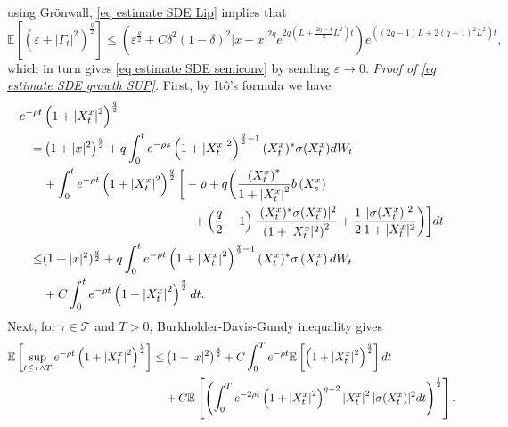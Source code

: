 \documentclass[11pt]{amsart}
\theoremstyle{plain}
\def \dd{{\rm d}}
\numberwithin{equation}{section}
\begin{document}
using Grönwall,  \eqref{eq estimate SDE Lip} implies that
$$
\mathbb{E}\left[\left(\varepsilon+\left|\Gamma_{t}\right|^{2}\right)^{\frac{q}{2}}\right] \leq\left(\varepsilon^{\frac q 2}+C \delta^2(1-\delta)^2 |\bar{x}-x|^{2 q} e^{2 q\left(L+\frac{2 q-1}{2} L^{2}\right) t}\right) e^{\left((2 q-1) L+2(q-1)^{2} L^{2}\right) t},
$$
which in turn gives \eqref{eq estimate SDE semiconv} by sending $\varepsilon \rightarrow 0$. 
\smallbreak\noindent
\emph{Proof of \eqref{eq estimate SDE growth SUP}.}
First, by It\^o's formula we have
$$
\begin{aligned}
e^{-\rho t}& \left(1+\left|X_{t}^{x}\right|^{2}\right)^{\frac{q}{2}}\\
=& \left(1+|x|^{2}\right)^{\frac{q}{2}}  +q \int_{0}^{t} e^{-\rho s}\left(1+\left| X_t^x \right|^{2}\right)^{\frac{q}{2}-1} (X_{t}^x)^{*} \sigma (X_t^x ) \dd W_{t}   \\
& +\int_{0}^{t} e^{-\rho t}\left(1+\left|X_{t}^{x}\right|^{2}\right)^{\frac{q}{2}}
\bigg[-\rho +q\bigg(\frac{\left(X_{t}^{x}\right)^{*}}{1+\left|X_{t}^{x}\right|^{2}} b\left(X_{s}^x\right) \\
& \qquad \qquad \qquad \qquad \qquad \qquad
+ \left(\frac{q}{2}-1\right) \frac{|( X_{t}^{x})^* \sigma( X_{t}^x ) | ^2} {
\left( 1+| X_t^x|^2 \right)^{2}} + \frac{1}{2} \frac{|\sigma  ( X_t^x)|^2}{  1+ | X_t^x|^{2} } \bigg) \bigg] \dd t \\
\leq & (1+|x|^2)^{\frac{q}{2}}+ q \int_{0}^{t} e^{-\rho t} \left( 1+\left|X^x_t \right|^{2}\right)^{\frac{q}{2}-1} (X^x_{t})^{*} \sigma\left(X^x_{t} \right) \dd W_{t} \\
& + C \int_{0}^{t} e^{-\rho t}\left(1+\left|X^x_{t}\right|^{2}\right)^{\frac{q}{2}} \dd t 
.
\end{aligned}
$$
Next, for $\tau \in \mathcal T$ and $T >0$, Burkholder-Davis-Gundy inequality gives
$$
\begin{aligned}
 \mathbb{E}\left[\sup _{t \leq \tau \land T } e^{-\rho t}\left(1+\left|X_{t}^{x}\right|^{2}\right)^{\frac{q}{2}}\right] \leq&  \left(1+|x|^{2}\right)^{\frac{q}{2}}+C \int_{0}^{T} e^{-\rho t} \mathbb{E}\left[\left(1+\left|X_{t}^{x}\right|^{2}\right)^{\frac{q}{2}}\right] \dd t \\
&+C \mathbb{E}\left[ \left( \int_{0}^{T} e^{-2 \rho t}\left(1+\left|X_{t}^{x}\right|^{2}\right)^{q-2}\left|X_{t}^{x}\right|^{2} | \sigma (X_{t}^{x})|^{2} \dd t\right)^{\frac{1}{2}} \right]. 
\end{aligned}
$$
\end{document}
